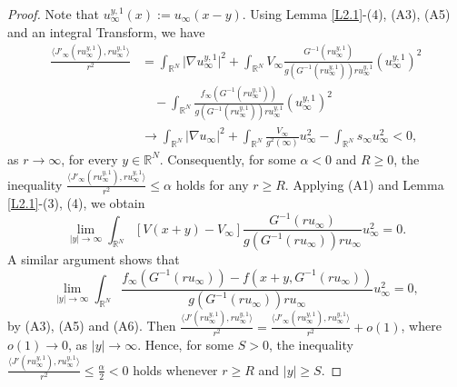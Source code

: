 \documentclass[10pt,a4paper]{amsart}
\numberwithin{equation}{section}
\begin{document}
\begin{proof} 
Note that $u_{\infty}^{y,1}(x):=u_{\infty}(x-y)$. Using Lemma \ref{L2.1}-(4), (A3), (A5) and an 
integral Transform, we have
\begin{align*}
\frac{\langle J'_{\infty}(ru_{\infty}^{y,1}),ru_{\infty}^{y,1}\rangle}{r^{2}} 
&= \int_{\mathbb{R}^{N}} \vert \nabla u_{\infty}^{y,1} \vert^{2} + \int_{\mathbb{R}^{N}} V_{\infty} \frac{G^{-1}(ru_{\infty}^{y,1})}{g(G^{-1}(ru_{\infty}^{y,1}))ru_{\infty}^{y,1}} (u_{\infty}^{y,1})^{2} \\
&\quad - \int_{\mathbb{R}^{N}}  \frac{f_\infty (G^{-1}(ru_{\infty}^{y,1}))}{g(G^{-1}(ru_{\infty}^{y,1}))ru_{\infty}^{y,1}} (u_{\infty}^{y,1})^{2} \\
&\to \int_{\mathbb{R}^{N}} \vert \nabla u_{\infty} \vert^{2} +\int_{\mathbb{R}^{N}} \frac{V_{\infty} }{g^2(\infty)}u_{\infty}^{2}- \int_{\mathbb{R}^{N}} s_{\infty} u_{\infty}^{2} < 0,
\end{align*}
as $r\to\infty$, for every $y\in{\mathbb{R}^N}$.  Consequently, for some $\alpha<0$ and $R\geq0$, 
the inequality $\frac{\langle J'_{\infty}(ru_{\infty}^{y,1}),ru_{\infty}^{y,1}\rangle}{r^{2}}\leq \alpha$ 
holds for any $r\geq R$.  Applying  (A1) and Lemma \ref{L2.1}-(3), (4), we obtain
$$
\lim_{|y|\to\infty} \int_{\mathbb{R}^{N}} [V(x+y)-V_{\infty}]\frac{G^{-1}(ru_{\infty})}{g(G^{-1}(ru_{\infty}))ru_{\infty}} u_{\infty}^{2}=0.
$$
A similar argument shows that 
$$
\lim_{|y|\to\infty}  \int_{\mathbb{R}^{N}}  \frac{f_\infty (G^{-1}(ru_{\infty}))-f(x+y,G^{-1}(ru_{\infty}))}{g(G^{-1}(ru_{\infty}))ru_{\infty}} u_{\infty}^{2} =0,
$$
by (A3), (A5) and  (A6). 
Then $\frac{\langle J'(ru_{\infty}^{y,1}),ru_{\infty}^{y,1}\rangle}{r^{2}}
=\frac{\langle J'_{\infty}(ru_{\infty}^{y,1}),ru_{\infty}^{y,1}\rangle}{r^{2}}+o(1)$, 
where $o(1)\to 0$, as $|y|\to\infty$. Hence, for some $S>0$, the inequality 
$\frac{\langle J'(ru_{\infty}^{y,1}),ru_{\infty}^{y,1}\rangle}{r^{2}}\leq\frac{\alpha}{2}<0$ 
holds whenever $r\geq R$ and $|y|\geq S$.


\end{proof}
\end{document}

